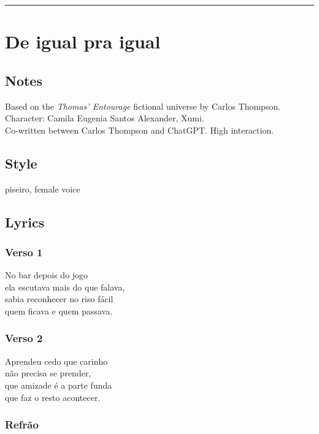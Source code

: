 \begin{center}\rule{0.5\linewidth}{0.5pt}\end{center}

\section{De igual pra igual}\label{de-igual-pra-igual}

\subsection{Notes}\label{notes-3}

Based on the \emph{Thomas' Entourage} fictional universe by Carlos
Thompson.\\
Character: Camila Eugenia Santos Alexander, Xumi.\\
Co-written between Carlos Thompson and ChatGPT. High interaction.

\subsection{Style}\label{style-3}

piseiro, female voice

\subsection{Lyrics}\label{lyrics-3}

\subsubsection{Verso 1}\label{verso-1-1}

No bar depois do jogo\\
ela escutava mais do que falava,\\
sabia reconhecer no riso fácil\\
quem ficava e quem passava.

\subsubsection{Verso 2}\label{verso-2-1}

Aprendeu cedo que carinho\\
não precisa se prender,\\
que amizade é a parte funda\\
que faz o resto acontecer.

\subsubsection{Refrão}\label{refruxe3o}

